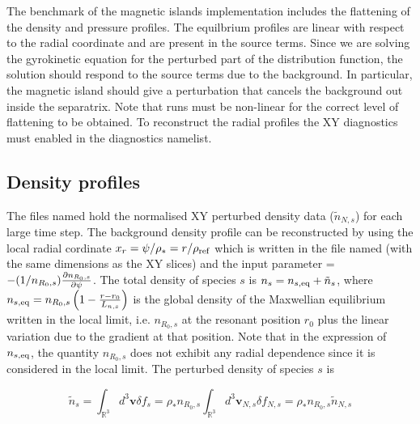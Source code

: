 The benchmark of the magnetic islands implementation includes the flattening of the density and pressure profiles. The equilbrium profiles are linear with respect to the radial coordinate and are present in the source terms.  Since we are solving the gyrokinetic equation for the perturbed part of the distribution function, the solution should respond to the source terms due to the background. In particular, the magnetic island should give a perturbation that cancels the background out inside the separatrix. Note that runs must be non-linear for the correct level of flattening to be obtained. To reconstruct the radial profiles the XY diagnostics must enabled in the diagnostics namelist.


\subsection{Density profiles}

The files named  hold the normalised XY perturbed density data ($\tilde{n}_{N,s}$) for each large time step. The background density profile can be reconstructed by using the local radial cordinate $x_r = \psi / \rho_* = r / \rho_{\rm ref}$ which is written in the file named  (with the same dimensions as the XY slices) and the input parameter  = $-(1/n_{R_0,s}) {\partial n_{R_0,s} \over \partial \psi}$. The total density of species $s$ is $n_s = n_{s,\rm eq} + \tilde{n}_s$, where $n_{s,\rm eq} = n_{R_0,s}\left(1-{r-r_0\over L_{n,s}}\right)$ is the global density of the Maxwellian equilibrium written in the local limit, i.e. $n_{R_0,s}$ at the resonant position $r_0$ plus the linear variation due to the gradient at that position. Note that in the expression of $n_{s,\rm eq}$, the quantity $n_{R_0,s}$ does not exhibit any radial dependence since it is considered in the local limit. The perturbed density of species $s$ is

\begin{equation}
\tilde{n}_s = \int_{\mathbb R^3} d^3\mathbf{v}\delta f_s = \rho_*n_{R_0,s}\int_{\mathbb R^3} d^3\mathbf{v}_{N,s}\delta f_{N,s} = \rho_*n_{R_0,s}\tilde{n}_{N,s}
\end{equation}

